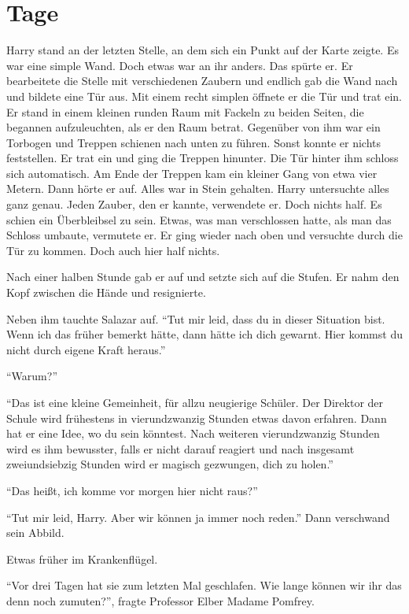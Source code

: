 \chapter{Tage}


Harry stand an der letzten Stelle, an dem sich ein Punkt auf der Karte zeigte. Es war eine simple Wand. Doch etwas war an ihr anders. Das spürte er. Er bearbeitete die Stelle mit verschiedenen Zaubern und endlich gab die Wand nach und bildete eine Tür aus. Mit einem recht simplen  öffnete er die Tür und trat ein. Er stand in einem kleinen runden Raum mit Fackeln zu beiden Seiten, die begannen aufzuleuchten, als er den Raum betrat. Gegenüber von ihm war ein Torbogen und Treppen schienen nach unten zu führen. Sonst konnte er nichts feststellen. Er trat ein und ging die Treppen hinunter. Die Tür hinter ihm schloss sich automatisch. Am Ende der Treppen kam ein kleiner Gang von etwa vier Metern. Dann hörte er auf. Alles war in Stein gehalten. Harry untersuchte alles ganz genau. Jeden Zauber, den er kannte, verwendete er. Doch nichts half. Es schien ein Überbleibsel zu sein. Etwas, was man verschlossen hatte, als man das Schloss umbaute, vermutete er. Er ging wieder nach oben und versuchte durch die Tür zu kommen. Doch auch hier half nichts.

Nach einer halben Stunde gab er auf und setzte sich auf die Stufen. Er nahm den Kopf zwischen die Hände und resignierte.

Neben ihm tauchte Salazar auf. \enquote{Tut mir leid, dass du in dieser Situation bist. Wenn ich das früher bemerkt hätte, dann hätte ich dich gewarnt. Hier kommst du nicht durch eigene Kraft heraus.}

\enquote{Warum?}

\enquote{Das ist eine kleine Gemeinheit, für allzu neugierige Schüler. Der Direktor der Schule wird frühestens in vierundzwanzig Stunden etwas davon erfahren. Dann hat er eine Idee, wo du sein könntest. Nach weiteren vierundzwanzig Stunden wird es ihm bewusster, falls er nicht darauf reagiert und nach insgesamt zweiundsiebzig Stunden wird er magisch gezwungen, dich zu holen.}

\enquote{Das heißt, ich komme vor morgen hier nicht raus?}

\enquote{Tut mir leid, Harry. Aber wir können ja immer noch reden.} Dann verschwand sein Abbild.

\trenn

Etwas früher im Krankenflügel.

\enquote{Vor drei Tagen hat sie zum letzten Mal geschlafen. Wie lange können wir ihr das denn noch zumuten?}, fragte Professor Elber Madame Pomfrey.

